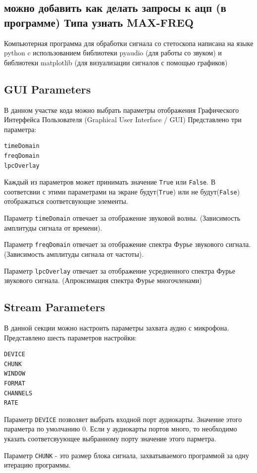 \subsection{можно добавить как делать запросы к ацп (в программе) Типа узнать MAX-FREQ}


Компьютерная программа для обработки сигнала со стетоскопа написана на языке python c использованием библиотеки pyaudio (для работы со звуком) и библиотеки matplotlib (для визуализации сигналов с помощью графиков)
\subsection{GUI Parameters}
В данном участке кода можно выбрать параметры отображения Графического Интерфейса Пользователя (Graphical User Interface / GUI)
Представлено три параметра:
\begin{verbatim}
timeDomain
freqDomain
lpcOverlay
\end{verbatim}

Каждый из параметров может принимать значение \verb|True| или \verb|False|. В соответсвии с этими параметрами на экране будут(\verb|True|) или не будут(\verb|False|) отображаться соответсвующие элементы.

Параметр \verb|timeDomain| отвечает за отображение звуковой волны. (Зависимость амплитуды сигнала от времени). 

Параметр \verb|freqDomain| отвечает за отображение спектра Фурье звукового сигнала. (Зависимость амплитуды сигнала от частоты). 

Параметр \verb|lpcOverlay| отвечает за отображение усредненного спектра Фурье звукового сигнала. (Апроксимация спектра Фурье многочленами)

\subsection{Stream Parameters}
В данной секции можно настроить параметры захвата аудио с микрофона. Представлено шесть параметров настройки:
\begin{verbatim}
DEVICE
CHUNK
WINDOW
FORMAT
CHANNELS
RATE
\end{verbatim}

Параметр \verb|DEVICE| позволяет выбрать входной порт аудиокарты. Значение этого параметра по умолчанию 0. Если у аудиокарты портов много, то необходимо указать соответсвуующее выбранному  порту значение этого парметра. 

Параметр \verb|CHUNK| - это размер блока сигнала, захватываемого программой за одну итерацию программы. 

